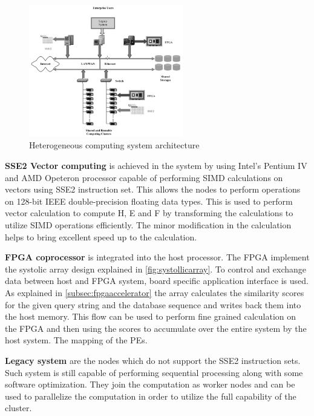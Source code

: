 \documentclass[12pt,twoside]{article}
\begin{document}
\begin{figure}[h]%
    \centering
    \includegraphics[width=0.6\textwidth]{fig/hetero}
    \caption{Heterogeneous computing system architecture \cite[Figure 1]{meng_high-performance_2010}}
    \label{fig:hetero}
\end{figure}

\textbf{SSE2 Vector computing} is achieved in the system by using Intel's Pentium IV and AMD Opeteron processor capable of performing SIMD calculations
on vectors using SSE2 instruction set. This allows the nodes to perform operations on 128-bit IEEE double-precision floating data types. This is used 
to perform vector calculation to compute H, E and F by transforming the calculations to utilize SIMD operations efficiently. The minor modification in
the calculation helps to bring excellent speed up to the calculation.

\textbf{FPGA coprocessor} is integrated into the host processor. The FPGA implement the systolic array design explained in \cref{fig:systollicarray}.
To control and exchange data between host and FPGA system, board specific application interface is used. As explained in \cref{subsec:fpgaaccelerator} the array calculates the 
similarity scores for the given query string and the database sequence and writes back them into the host memory. This flow can be used to
perform fine grained calculation on the FPGA and then using the scores to accumulate over the entire system by the host system. The mapping of the 
PEs.

\textbf{Legacy system} are the nodes which do not support the SSE2 instruction sets. Such system is still capable of performing
sequential processing along with some software optimization. They join the computation as worker nodes and can be used to parallelize
the computation in order to utilize the full capability of the cluster.
\end{document}
